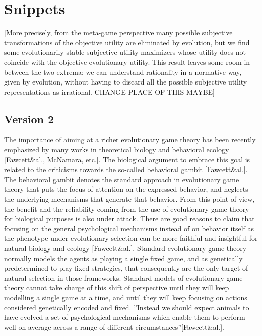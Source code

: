 \documentclass[fleqn,reqno,11pt]{article}
\begin{document}
\printbibliography[heading=bibintoc]


\newpage

\section{Snippets}

[More precisely, from the meta-game perspective many possible subjective
transformations of the objective utility are eliminated by evolution, but we find some
evolutionarily stable subjective utility maximizers whose utility does not coincide with the
objective evolutionary utility. This result leaves some room in between the two extrema: we can
understand rationality in a normative way, given by evolution, without having to discard all
the possible subjective utility representations as irrational. CHANGE PLACE OF THIS MAYBE]



\subsection{Version 2}

The importance of aiming at a richer evolutionary game theory has been recently emphasized by many works in theoretical biology and behavioral ecology [Fawcett\&al., McNamara, etc.]. The biological argument to embrace this goal is related to the criticisms towards the so-called behavioral gambit [Fawcett\&al.]. The behavioral gambit denotes the standard approach in evolutionary game theory that puts the focus of attention on the expressed behavior, and neglects the underlying mechanisms that generate that behavior. From this point of view, the benefit and the reliability coming from the use of evolutionary game theory for biological purposes is also under attack. There are good reasons to claim that focusing on the general psychological mechanisms instead of on behavior itself as the phenotype under evolutionary selection can be more faithful and insightful for natural biology and ecology [Fawcett\&al.].
Standard evolutionary game theory normally models the agents as playing a single fixed game, and as genetically predetermined to play fixed strategies, that consequently are the only target of natural selection in those frameworks. Standard models of evolutionary game theory cannot take charge of this shift of perspective until they will keep modelling a single game at a time, and until they will keep focusing on actions considered genetically encoded and fixed. ''Instead we should expect animals to have evolved a set of psychological mechanisms which enable them to perform well on average across a range of different circumstances''[Fawcett\&al.].
\end{document}
